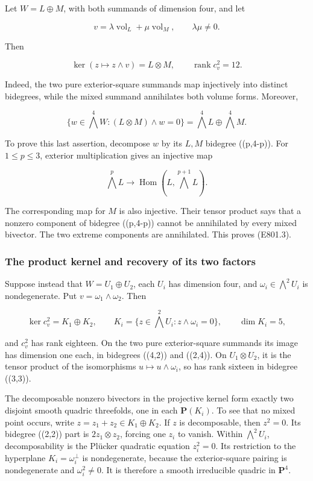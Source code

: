 Let \(W=L\oplus M\), with both summands of dimension four, and let

\[
 v=\lambda\operatorname{vol}_L+\mu\operatorname{vol}_M,
 \qquad\lambda\mu\ne0.
\]

Then

\[
 \ker(z\mapsto z\wedge v)=L\otimes M,
 \qquad\operatorname{rank}c_v^2=12.
 \tag{E801.2}
\]

Indeed, the two pure exterior-square summands map injectively into
distinct bidegrees, while the mixed summand annihilates both volume
forms. Moreover,

\[
 \{w\in\bigwedge^4W:(L\otimes M)\wedge w=0\}
       =\bigwedge^4L\oplus\bigwedge^4M.
 \tag{E801.3}
\]

To prove this last assertion, decompose \(w\) by its \(L,M\) bidegree
((p,4-p)). For \(1\le p\le3\), exterior multiplication gives an
injective map

\[
 \bigwedge^pL\longrightarrow
       \operatorname{Hom}(L,\bigwedge^{p+1}L).
\]

The corresponding map for \(M\) is also injective. Their tensor product
says that a nonzero component of bidegree ((p,4-p)) cannot be
annihilated by every mixed bivector. The two extreme components are
annihilated. This proves (E801.3).

\subsubsection{The product kernel and recovery of its two
factors}\label{the-product-kernel-and-recovery-of-its-two-factors}

Suppose instead that \(W=U_1\oplus U_2\), each \(U_i\) has dimension
four, and \(\omega_i\in\bigwedge^2U_i\) is nondegenerate. Put
\(v=\omega_1\wedge\omega_2\). Then

\[
 \ker c_v^2=K_1\oplus K_2,
 \qquad K_i=\{z\in\bigwedge^2U_i:z\wedge\omega_i=0\},
 \qquad\dim K_i=5,
 \tag{E801.4}
\]

and \(c_v^2\) has rank eighteen. On the two pure exterior-square
summands its image has dimension one each, in bidegrees ((4,2)) and
((2,4)). On \(U_1\otimes U_2\), it is the tensor product of the
isomorphisms \(u\mapsto u\wedge\omega_i\), so has rank sixteen in
bidegree ((3,3)).

The decomposable nonzero bivectors in the projective kernel form exactly
two disjoint smooth quadric threefolds, one in each \(\mathbf P(K_i)\).
To see that no mixed point occurs, write \(z=z_1+z_2\in K_1\oplus K_2\).
If \(z\) is decomposable, then \(z^2=0\). Its bidegree ((2,2)) part is
\(2z_1\otimes z_2\), forcing one \(z_i\) to vanish. Within
\(\bigwedge^2U_i\), decomposability is the Plücker quadratic equation
\(z_i^2=0\). Its restriction to the hyperplane \(K_i=\omega_i^\perp\) is
nondegenerate, because the exterior-square pairing is nondegenerate and
\(\omega_i^2\ne0\). It is therefore a smooth irreducible quadric in
\(\mathbf P^4\).


